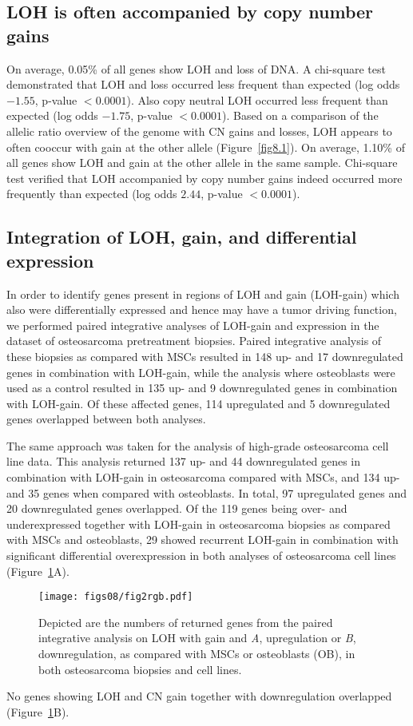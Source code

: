 \subsection{LOH is often accompanied by copy number gains }
On average, 0.05\% of all genes show LOH and loss of DNA. A chi-square test demonstrated that LOH and loss occurred less frequent than expected (log odds $-1.55$, p-value $<0.0001$). Also copy neutral LOH occurred less frequent than expected (log odds $-1.75$, p-value $<0.0001$). Based on a comparison of the allelic ratio overview of the genome with CN gains and losses, LOH appears to often cooccur with gain at the other allele (Figure~\ref{fig8.1}). On average, 1.10\% of all genes show LOH and gain at the other allele in the same sample. Chi-square test verified that LOH accompanied by copy number gains indeed occurred more frequently than expected (log odds $2.44$, p-value $<0.0001$).

\subsection{Integration of LOH, gain, and differential expression}
In order to identify genes present in regions of LOH and gain (LOH-gain) which also were differentially expressed and hence may have a tumor driving function, we performed paired integrative analyses of LOH-gain and expression in the dataset of osteosarcoma pretreatment biopsies. Paired integrative analysis of these biopsies as compared with MSCs resulted in 148 up- and 17 downregulated genes in combination with LOH-gain, while the analysis where osteoblasts were used as a control resulted in 135 up- and 9 downregulated genes in combination with LOH-gain. Of these affected genes, 114 upregulated and 5 downregulated genes overlapped between both analyses. 

The same approach was taken for the analysis of high\hyp{}grade osteosarcoma cell line data. This analysis returned 137 up- and 44 downregulated genes in combination with LOH-gain in osteosarcoma compared with MSCs, and 134 up- and 35 genes when compared with osteoblasts. In total, 97 upregulated genes and 20 downregulated genes overlapped. Of the 119 genes being over- and underexpressed together with LOH-gain in osteosarcoma biopsies as compared with MSCs and osteoblasts, 29 showed recurrent LOH-gain in combination with significant differential overexpression in both analyses of osteosarcoma cell lines (Figure~\ref{fig8.2}A).
%
\begin{figure}[htbp]
  \centering
   \texttt{[image: figs08/fig2rgb.pdf]}	%
    \hfill
     \caption{Depicted are the numbers of returned genes from the paired integrative analysis on LOH with gain and {\it A}, upregulation or {\it B}, downregulation, as compared with MSCs or osteoblasts (OB), in both osteosarcoma biopsies and cell lines.}
     \label{fig8.2}
\end{figure}
%
No genes showing LOH and CN gain together with downregulation overlapped (Figure~\ref{fig8.2}B).

